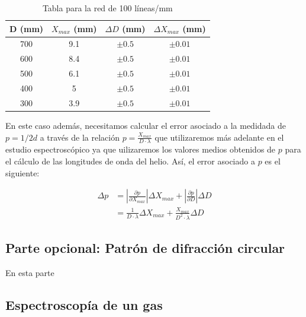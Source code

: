 \documentclass[11pt, a4paper, twocolumn]{article}
\begin{document}
\vspace{0.5cm}

\begin{table}[H]
    \caption{Tabla para la red de 100 líneas/mm}
    \centering
    \small
    \setlength{\tabcolsep}{4pt}

    \begin{tabular}{cccc}
        \hline
        D (mm) &   $X_{max}$ (mm) & $\Delta D$ (mm)   & $\Delta X_{max}$ (mm)   \\
        \hline
            700 &            9.1 & $\pm 0.5$         & $\pm 0.01$              \\
            600 &            8.4 & $\pm 0.5$         & $\pm 0.01$              \\
            500 &            6.1 & $\pm 0.5$         & $\pm 0.01$              \\
            400 &            5   & $\pm 0.5$         & $\pm 0.01$              \\
            300 &            3.9 & $\pm 0.5$         & $\pm 0.01$              \\
        \hline
    \end{tabular}

\end{table}

En este caso además, necesitamos calcular el error asociado a la medidada de $p = 1/2d$ a través de la relación $p = \frac{X_{max}}{D \cdot \lambda}$ que utilizaremos
más adelante en el estudio espectroscópico ya que uilizaremos los valores medios obtenidos de $p$ para el cálculo de las longitudes de onda del helio. Así, el error asociado a $p$ es el siguiente:

\begin{align}
    \Delta p &= \left|\frac{\partial p}{\partial X_{max}}\right|\Delta X_{max} + \left|\frac{\partial p}{\partial D}\right|\Delta D \\
    &= \frac{1}{D \cdot \lambda} \Delta X_{max} + \frac{X_{max}}{D^2 \cdot \lambda} \Delta D
\end{align}

\subsection{Parte opcional: Patrón de difracción circular}
En esta parte

\subsection{Espectroscopía de un gas}
\end{document}
